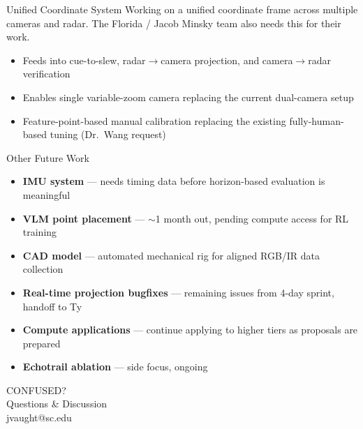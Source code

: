 \documentclass[10pt, aspectratio=169]{beamer}
\begin{document}
\begin{frame}{Unified Coordinate System}
  Working on a unified coordinate frame across multiple cameras and radar. The Florida / Jacob Minsky team also needs this for their work.

  \vspace{0.5em}
  \begin{itemize}
    \item Feeds into cue-to-slew, radar$\rightarrow$camera projection, and camera$\rightarrow$radar verification
    \item Enables single variable-zoom camera replacing the current dual-camera setup
    \item Feature-point-based manual calibration replacing the existing fully-human-based tuning (Dr.\ Wang request)
  \end{itemize}
\end{frame}

\begin{frame}{Other Future Work}
  \begin{itemize}
    \item \textbf{IMU system} --- needs timing data before horizon-based evaluation is meaningful
    \item \textbf{VLM point placement} --- $\sim$1 month out, pending compute access for RL training
    \item \textbf{CAD model} --- automated mechanical rig for aligned RGB/IR data collection
    \item \textbf{Real-time projection bugfixes} --- remaining issues from 4-day sprint, handoff to Ty
    \item \textbf{Compute applications} --- continue applying to higher tiers as proposals are prepared
    \item \textbf{Echotrail ablation} --- side focus, ongoing
  \end{itemize}
\end{frame}

{
  \begin{frame}[plain]
    \vfill
    \centering
    {\fontsize{50}{55}\selectfont\impactfont\color{UofSCWhite} CONFUSED?}\\[1em]
    {\Large\color{UofSCWhite} Questions \& Discussion}\\[0.5em]
    {\normalsize\color{UofSCGray30} jvaught@sc.edu}
    \vfill
  \end{frame}
}
\end{document}

